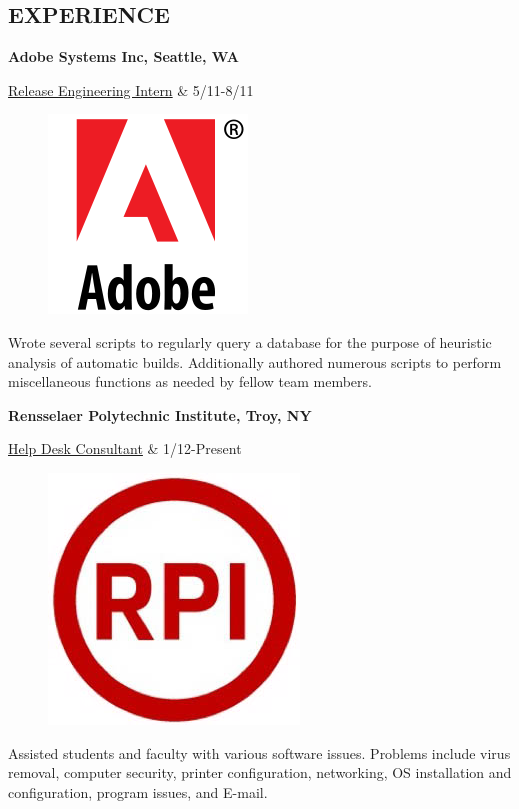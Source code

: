 \documentclass[margin,11pt]{res} %
\begin{document}
\begin{resume}
\section{EXPERIENCE}      {\bf Adobe Systems Inc, Seattle, WA}  \\
                \begin{ncolumn}{2} %
                  \underline{Release Engineering Intern}     &      5/11-8/11
                \end{ncolumn}
                
                
\begin{figure} %
\centering
\hspace{-1in}\includegraphics[scale=0.15]{adobe.png}
\end{figure}                Wrote several scripts to regularly query a database for the purpose of heuristic analysis of automatic builds. Additionally authored numerous scripts to perform miscellaneous functions as needed by fellow team members.

                {\bf Rensselaer Polytechnic Institute, Troy, NY} \\
                \begin{ncolumn}{2}
                  \underline{Help Desk Consultant} & 1/12-Present
                \end{ncolumn}

\begin{figure}
\centering
\hspace{-0.9in}\includegraphics[scale=0.13]{rpi.png}
\end{figure}                Assisted students and faculty with various software issues. Problems include virus removal, computer security, printer configuration, networking, OS installation and configuration, program issues, and E-mail.
\end{resume} 
\end{document}

